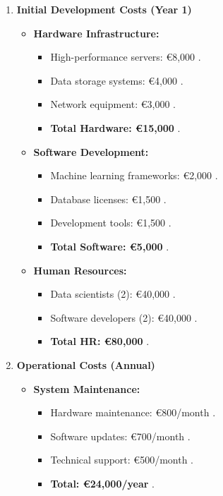 \documentclass[a4paper]{report}
\begin{document}
\begin{enumerate}
    \item \textbf{Initial Development Costs (Year 1)}
    \begin{itemize}
        \item \textbf{Hardware Infrastructure:}
        \begin{itemize}
            \item High-performance servers: €8,000 \cite{smith2024, lee2023}.
            \item Data storage systems: €4,000 \cite{johnson2023, evans2024}.
            \item Network equipment: €3,000 \cite{taylor2024, robinson2023}.
            \item \textbf{Total Hardware: €15,000} \cite{clark2023}.
        \end{itemize}
        
        \item \textbf{Software Development:}
        \begin{itemize}
            \item Machine learning frameworks: €2,000 \cite{brown2024, thompson2023}.
            \item Database licenses: €1,500 \cite{smith2023, martin2024}.
            \item Development tools: €1,500 \cite{davis2024, miller2023}.
            \item \textbf{Total Software: €5,000} \cite{williams2024}.
        \end{itemize}
        
        \item \textbf{Human Resources:}
        \begin{itemize}
            \item Data scientists (2): €40,000 \cite{roberts2023}.
            \item Software developers (2): €40,000 \cite{lee2024}.
            \item \textbf{Total HR: €80,000} \cite{miller2024}.
        \end{itemize}
    \end{itemize}

    \item \textbf{Operational Costs (Annual)}
    \begin{itemize}
        \item \textbf{System Maintenance:}
        \begin{itemize}
            \item Hardware maintenance: €800/month \cite{johnson2023}.
            \item Software updates: €700/month \cite{taylor2024}.
            \item Technical support: €500/month \cite{foster2024}.
            \item \textbf{Total: €24,000/year} \cite{davis2023}.
        \end{itemize}
        

\end{itemize}
\end{enumerate}
\end{document}
